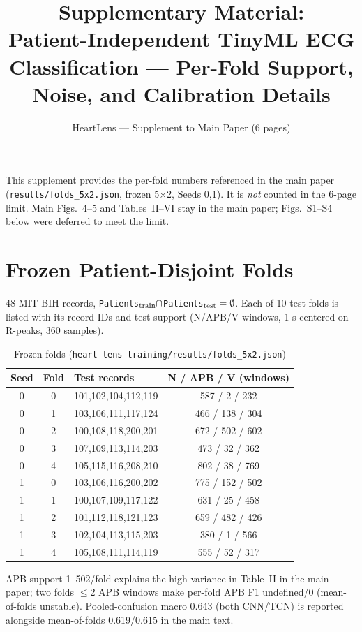 \documentclass[10pt, conference, letterpaper]{IEEEtran}
\begin{document}
\title{Supplementary Material:\\Patient-Independent TinyML ECG Classification --- Per-Fold Support, Noise, and Calibration Details}
\author{HeartLens --- Supplement to Main Paper (6 pages)}
\maketitle
This supplement provides the per-fold numbers referenced in the main paper (\texttt{results/folds\_5x2.json}, frozen 5$\times$2, Seeds 0,1). It is \emph{not} counted in the 6-page limit. Main Figs.~4--5 and Tables~II--VI stay in the main paper; Figs.~S1--S4 below were deferred to meet the limit.

\section{Frozen Patient-Disjoint Folds}
48 MIT-BIH records, \texttt{Patients$_{\rm train}\cap$Patients$_{\rm test}=\emptyset$}. Each of 10 test folds is listed with its record IDs and test support (N/APB/V windows, 1-s centered on R-peaks, 360 samples).
\begin{table}[h]
\centering
\caption{Frozen folds (\texttt{heart-lens-training/results/folds\_5x2.json})}
\label{tab:supp-folds}
\footnotesize
\begin{tabular}{ccl c}
\toprule
Seed & Fold & Test records & N / APB / V (windows)\\
\midrule
0&0&101,102,104,112,119 & 587 / 2 / 232\\
0&1&103,106,111,117,124 & 466 / 138 / 304\\
0&2&100,108,118,200,201 & 672 / 502 / 602\\
0&3&107,109,113,114,203 & 473 / 32 / 362\\
0&4&105,115,116,208,210 & 802 / 38 / 769\\
1&0&103,106,116,200,202 & 775 / 152 / 502\\
1&1&100,107,109,117,122 & 631 / 25 / 458\\
1&2&101,112,118,121,123 & 659 / 482 / 426\\
1&3&102,104,113,115,203 & 380 / 1 / 566\\
1&4&105,108,111,114,119 & 555 / 52 / 317\\
\bottomrule
\end{tabular}
\end{table}
APB support 1--502/fold explains the high variance in Table~II in the main paper; two folds $\le$2 APB windows make per-fold APB F1 undefined/0 (mean-of-folds unstable). Pooled-confusion macro 0.643 (both CNN/TCN) is reported alongside mean-of-folds 0.619/0.615 in the main text.
\end{document}
